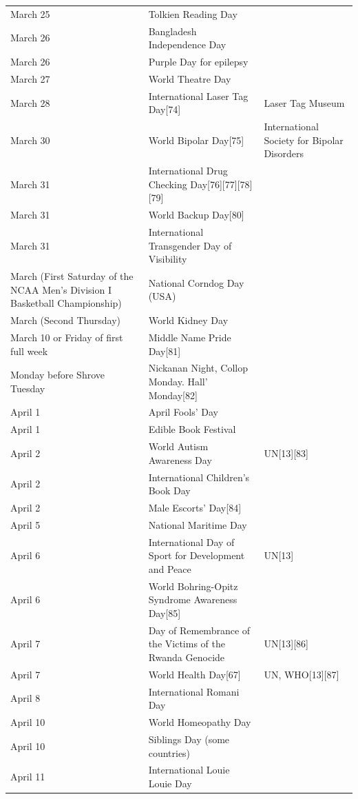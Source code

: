 \documentclass[
]{book}
\begin{document}
\begin{longtable}[t]{>{\raggedright\arraybackslash}p{8em}>{\raggedright\arraybackslash}p{20em}>{\raggedright\arraybackslash}p{12em}}
March 25 & Tolkien Reading Day & \\
March 26 & Bangladesh Independence Day & \\
March 26 & Purple Day for epilepsy & \\
March 27 & World Theatre Day & \\
\addlinespace
March 28 & International Laser Tag Day[74] & Laser Tag Museum\\
March 30 & World Bipolar Day[75] & International Society for Bipolar Disorders\\
March 31 & International Drug Checking Day[76][77][78][79] & \\
March 31 & World Backup Day[80] & \\
March 31 & International Transgender Day of Visibility & \\
\addlinespace
March (First Saturday of the NCAA Men's Division I Basketball Championship) & National Corndog Day (USA) & \\
March (Second Thursday) & World Kidney Day & \\
March 10 or Friday of first full week & Middle Name Pride Day[81] & \\
Monday before Shrove Tuesday & Nickanan Night, Collop Monday. Hall' Monday[82] & \\
April 1 & April Fools' Day & \\
\addlinespace
April 1 & Edible Book Festival & \\
April 2 & World Autism Awareness Day & UN[13][83]\\
April 2 & International Children's Book Day & \\
April 2 & Male Escorts' Day[84] & \\
April 5 & National Maritime Day & \\
\addlinespace
April 6 & International Day of Sport for Development and Peace & UN[13]\\
April 6 & World Bohring-Opitz Syndrome Awareness Day[85] & \\
April 7 & Day of Remembrance of the Victims of the Rwanda Genocide & UN[13][86]\\
April 7 & World Health Day[67] & UN, WHO[13][87]\\
April 8 & International Romani Day & \\
\addlinespace
April 10 & World Homeopathy Day & \\
April 10 & Siblings Day (some countries) & \\
April 11 & International Louie Louie Day & \\

\end{longtable}
\end{document}
